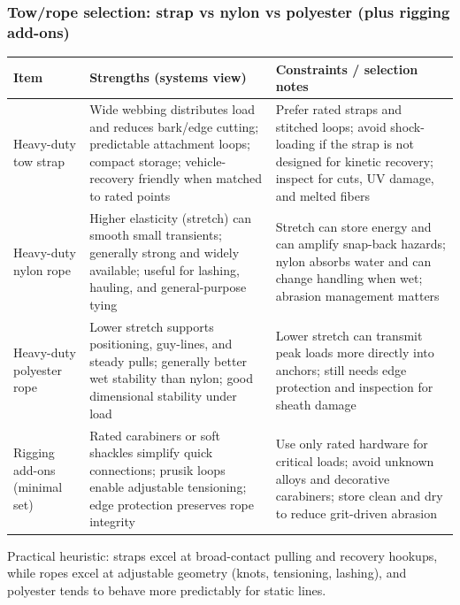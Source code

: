 \begin{frame}[t,shrink=6]
  \frametitle{Tow/rope selection: strap vs nylon vs polyester (plus rigging add-ons)}
  \justifying
  \TableBodySize
  \begin{table}
    \centering
    \begin{tabularx}{\textwidth}{@{}lX X@{}}
      \toprule
      \textbf{Item} & \textbf{Strengths (systems view)} & \textbf{Constraints / selection notes} \\
      \midrule
      Heavy-duty tow strap &
      Wide webbing distributes load and reduces bark/edge cutting; predictable attachment loops; compact storage; vehicle-recovery friendly when matched to rated points &
      Prefer rated straps and stitched loops; avoid shock-loading if the strap is not designed for kinetic recovery; inspect for cuts, UV damage, and melted fibers \\
      \addlinespace
      Heavy-duty nylon rope &
      Higher elasticity (stretch) can smooth small transients; generally strong and widely available; useful for lashing, hauling, and general-purpose tying &
      Stretch can store energy and can amplify snap-back hazards; nylon absorbs water and can change handling when wet; abrasion management matters \\
      \addlinespace
      Heavy-duty polyester rope &
      Lower stretch supports positioning, guy-lines, and steady pulls; generally better wet stability than nylon; good dimensional stability under load &
      Lower stretch can transmit peak loads more directly into anchors; still needs edge protection and inspection for sheath damage \\
      \addlinespace
      Rigging add-ons (minimal set) &
      Rated carabiners or soft shackles simplify quick connections; prusik loops enable adjustable tensioning; edge protection preserves rope integrity &
      Use only rated hardware for critical loads; avoid unknown alloys and decorative carabiners; store clean and dry to reduce grit-driven abrasion \\
      \bottomrule
    \end{tabularx}
  \end{table}

  \vspace{0.4em}
  \scriptsize
  Practical heuristic: straps excel at broad-contact pulling and recovery hookups, while ropes excel at adjustable geometry (knots, tensioning, lashing), and polyester tends to behave more predictably for static lines.
\end{frame}

